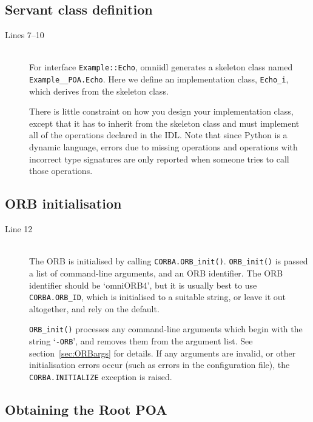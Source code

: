 \documentclass[11pt,oneside,a4paper]{book}
\newcommand{\type}[1]{\texttt{#1}}
\newcommand{\intf}[1]{\texttt{#1}}
\newcommand{\code}[1]{\texttt{#1}}
\newcommand{\op}[1]{\texttt{#1()}}
\newcommand{\cmdline}[1]{\texttt{#1}}
\begin{document}
\subsection{Servant class definition}

\begin{description}

\item[Lines 7--10]\mbox{}\\
%
For interface \intf{Example::Echo}, omniidl generates a skeleton class
named \type{Example\_\_POA.Echo}. Here we define an implementation
class, \type{Echo\_i}, which derives from the skeleton class.

There is little constraint on how you design your implementation
class, except that it has to inherit from the skeleton class and must
implement all of the operations declared in the IDL. Note that since
Python is a dynamic language, errors due to missing operations and
operations with incorrect type signatures are only reported when
someone tries to call those operations.

\end{description}


\subsection{ORB initialisation}

\begin{description}

\item[Line 12]\mbox{}\\
%
The ORB is initialised by calling \op{CORBA.ORB\_init}.
\op{ORB\_init} is passed a list of command-line arguments, and
an ORB identifier. The ORB identifier should be `omniORB4', but it is
usually best to use \code{CORBA.ORB\_ID}, which is initialised to a
suitable string, or leave it out altogether, and rely on the default.

\op{ORB\_init} processes any command-line arguments which begin with
the string `\cmdline{-ORB}', and removes them from the argument
list. See section~\ref{sec:ORBargs} for details. If any arguments are
invalid, or other initialisation errors occur (such as errors in the
configuration file), the \code{CORBA.INITIALIZE} exception is raised.

\end{description}

\subsection{Obtaining the Root POA}
\end{document}
